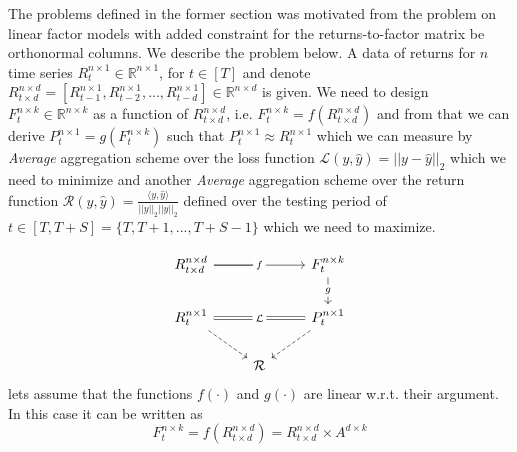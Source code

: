  \label{problem_linear_factor_model}
The problems defined in the former section was motivated from the problem on linear factor models with added constraint for the returns-to-factor matrix be orthonormal columns. We describe the problem below.\newline
\newline A data of returns for $n$ time series $R^{n\times 1}_t \in \mathbb{R}^{n\times 1}$, for $t\in [T]$ and denote $R^{n\times d}_{t\times d} = [R^{n\times 1}_{t-1},R^{n\times 1}_{t-2},...,R^{n\times 1}_{t-d}] \in \mathbb{R}^{n\times d}$ is given. 
\newline \newline We need to design $F^{n\times k}_t \in \mathbb{R}^{n\times k}$ as a function of $R^{n\times d}_{t\times d}$, i.e. $F^{n\times k}_t = f(R^{n\times d}_{t\times d})$ and from that we can derive $P^{n \times 1}_{t} = g(F^{n\times k}_t)$ such that $P^{n \times 1}_{t} \approx R^{n \times 1}_{t}$ which we can measure by \textit{Average} aggregation scheme over the loss function $\mathcal{L}(y,\hat{y}) = ||y-\hat{y}||_2$ which we need to minimize and another \textit{Average} aggregation scheme over the return function $\mathcal{R}(y,\hat{y}) = \frac{\langle y,\hat{y}\rangle}{||y||_2||\hat{y}||_2}$ defined over the testing period of $t \in [T,T+S]= \{T,T+1,...,T+S-1\}$ which we need to maximize.

\begin{equation} \label{lfm_diagram}
\begin{tikzcd}
R^{n\times d}_{t \times d} \arrow[rr, "f" description] \arrow[r, no head]& {}& F^{n\times k}_{t} \arrow[d, "g" description] \\
R^{n\times 1}_t \arrow[rr, "\mathcal{L}" description, Rightarrow, no head] \arrow[rd, dashed] && P^{n \times 1}_{t} \arrow[ld, dashed]\\
& \mathcal{R} &
\end{tikzcd}
\end{equation}
\newline
lets assume that the functions $f(\cdot)$ and $g(\cdot)$ are linear w.r.t. their argument. In this case it can be written as
\begin{equation} \label{f_for_lfm}
F^{n\times k}_t = f(R^{n\times d}_{t\times d}) = R^{n\times d}_{t\times d}\times A^{d\times k}
\end{equation}

